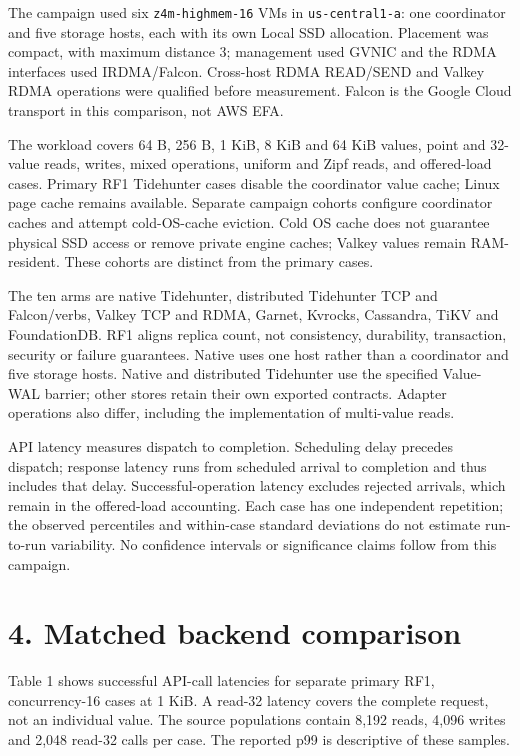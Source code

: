 \documentclass[10pt,a4paper]{article}
\begin{document}
The campaign used six \texttt{z4m-highmem-16} VMs in \texttt{us-central1-a}: one coordinator and five storage hosts, each with its own Local SSD allocation. Placement was compact, with maximum distance 3; management used GVNIC and the RDMA interfaces used IRDMA/Falcon. Cross-host RDMA READ/SEND and Valkey RDMA operations were qualified before measurement. Falcon is the Google Cloud transport in this comparison, not AWS EFA.

The workload covers 64 B, 256 B, 1 KiB, 8 KiB and 64 KiB values, point and 32-value reads, writes, mixed operations, uniform and Zipf reads, and offered-load cases. Primary RF1 Tidehunter cases disable the coordinator value cache; Linux page cache remains available. Separate campaign cohorts configure coordinator caches and attempt cold-OS-cache eviction. Cold OS cache does not guarantee physical SSD access or remove private engine caches; Valkey values remain RAM-resident. These cohorts are distinct from the primary cases.

The ten arms are native Tidehunter, distributed Tidehunter TCP and Falcon/verbs, Valkey TCP and RDMA, Garnet, Kvrocks, Cassandra, TiKV and FoundationDB. RF1 aligns replica count, not consistency, durability, transaction, security or failure guarantees. Native uses one host rather than a coordinator and five storage hosts. Native and distributed Tidehunter use the specified Value-WAL barrier; other stores retain their own exported contracts. Adapter operations also differ, including the implementation of multi-value reads.

API latency measures dispatch to completion. Scheduling delay precedes dispatch; response latency runs from scheduled arrival to completion and thus includes that delay. Successful-operation latency excludes rejected arrivals, which remain in the offered-load accounting. Each case has one independent repetition; the observed percentiles and within-case standard deviations do not estimate run-to-run variability. No confidence intervals or significance claims follow from this campaign.

\section*{4. Matched backend comparison}
Table 1 shows successful API-call latencies for separate primary RF1, concurrency-16 cases at 1 KiB. A read-32 latency covers the complete request, not an individual value. The source populations contain 8,192 reads, 4,096 writes and 2,048 read-32 calls per case. The reported p99 is descriptive of these samples.
\end{document}
